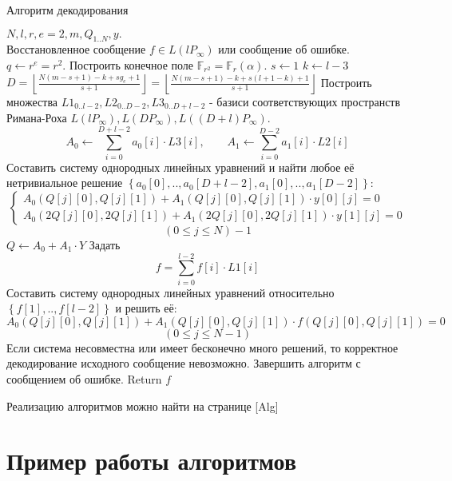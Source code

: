 \documentclass{article}
\def\F{\mathbb{F}}
\numberwithin{equation}{section}
\begin{document}
\begin{algorithm}[H]
	\caption{Алгоритм декодирования}\label{alg:decode}
	\begin{algorithmic}[1]
		\Require $ N,l,r,e=2,m,Q_{1..N},y. $
		\Ensure $ \text{Восстановленное сообщение } f \in L(lP_{\infty}) \text{ или сообщение об ошибке} $.
		\State $ q \gets r^e = r^2 $. Построить конечное поле $ \F_{r^2} = \F_r(\alpha) $.
		\State $ s \gets 1 $
		\State $ k \gets l - 3 $
		\State $ D = \left\lfloor \frac{N(m-s+1)-k+sg_e+1}{s+1} \right\rfloor = \left\lfloor \frac{N(m-s+1)-k+s(l+1-k)+1}{s+1} \right\rfloor $
		\State Построить множества $ L1_{0..l-2}, L2_{0..D-2}, L3_{0..D+l-2} $ - базиси соответствующих пространств Римана-Роха $ L(lP_{\infty}), L(DP_{\infty}), L((D+l)P_{\infty}) $.
		\State \[ A_0 \gets \sum_{i=0}^{D+l-2}{a_0[i] \cdot L3[i] }, \qquad
		A_1 \gets \sum_{i=0}^{D-2}{a_1[i] \cdot L2[i] } \]
		\State Составить систему однородных линейных уравнений и найти любое её нетривиальное решение $ \left\lbrace  a_0[0],..,a_0[D+l-2],a_1[0],..,a_1[D-2] \right\rbrace $:
		\[
		\begin{cases}
		A_0(Q[j][0], Q[j][1]) + A_1(Q[j][0], Q[j][1]) \cdot y[0][j] = 0 \\
		A_0(2Q[j][0], 2Q[j][1]) + A_1(2Q[j][0], 2Q[j][1]) \cdot y[1][j] = 0
		\end{cases}
		\]
		\[ (0 \leq j \leq N)-1 \]
		\State $ Q \gets A_0 + A_1 \cdot Y $
		\State Задать \[
		f = \sum_{i=0}^{l-2}{f[i] \cdot L1[i]}
		\]
		\State Составить систему однородных линейных уравнений относительно $ \left\lbrace  f[1],..,f[l-2] \right\rbrace $ и решить её:
		\[
		A_0(Q[j][0], Q[j][1]) + A_1(Q[j][0], Q[j][1]) \cdot f(Q[j][0], Q[j][1]) = 0
		\]
		\[ (0 \leq j \leq N-1) \]
		\State Если система несовместна или имеет бесконечно много решений, то корректное декодирование исходного сообщение невозможно.
		Завершить алгоритм с сообщением об ошибке.
		\State Return $ f $
	\end{algorithmic}	
\end{algorithm}
Реализацию алгоритмов можно найти на странице [Alg]



\section{Пример работы алгоритмов}
\end{document}
